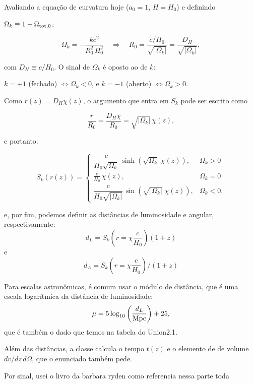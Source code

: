 \documentclass[11pt,a4paper]{article}
\begin{document}
Avaliando a equação de curvatura hoje ($a_0 = 1$, $H = H_0$) e definindo

$\Omega_k \equiv 1 - \Omega_{\rm tot,0}$:

\begin{equation}
\Omega_k = -\frac{k c^2}{R_0^2\, H_0^2}
\quad\Longrightarrow\quad
R_0 = \frac{c/H_0}{\sqrt{|\Omega_k|}} = \frac{D_H}{\sqrt{|\Omega_k|}},
\end{equation}

com $D_H \equiv c/H_0$. O sinal de $\Omega_k$ é oposto ao de $k$:

$k=+1$ (fechado) $\Leftrightarrow \Omega_k < 0$, e $k=-1$ (aberto) $\Leftrightarrow \Omega_k > 0$.

Como $r(z)=D_H\chi(z)$, o argumento que entra em $S_k$ pode ser escrito como

$$
\frac{r}{R_0}=\frac{D_H\chi}{R_0}
=\sqrt{|\Omega_k|}\,\chi(z),
$$

e portanto:

\begin{equation}
S_k(r(z)) =
\begin{cases}
\dfrac{c}{H_0\sqrt{ \Omega_k}}\,\sinh\!\left(\sqrt{\Omega_k}\;\chi(z)\right), & \Omega_k > 0\\[10pt]
\frac{c}{H_0}\,\chi(z), & \Omega_k = 0\\[10pt]
\dfrac{c}{H_0 \sqrt{|\Omega_k|}}\,\sin\!\left(\sqrt{|\Omega_k|}\;\chi(z)\right), & \Omega_k < 0.
\end{cases}
\end{equation}

e, por fim, podemos definir as distâncias de luminosidade e angular, respectivamente:
\begin{equation}
d_L=S_k (r=\chi\frac{c}{H_0})(1+z)
\end{equation}
e
\begin{equation}
d_A=S_k (r=\chi\frac{c}{H_0})/(1+z)
\end{equation}

Para escalas astronômicas, é comum usar o módulo de distância, que é uma escala logarítmica da distância de luminosidade:
\begin{equation}
  \mu= 5\log_{10}\left(\frac{d_L}{\rm Mpc}\right)+25,
\end{equation}
que é também o dado que temos na tabela do Union2.1.

Além das distâncias, a classe calcula o tempo $t(z)$ e o elemento de de volume $dv/dz\,d\Omega$, que o enunciado também pede.

Por sinal, usei o livro da barbara ryden como referencia nessa parte toda
\end{document}
